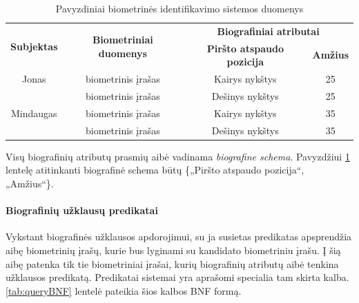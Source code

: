 \begin{table}[H]\footnotesize
	\centering
	\begin{tabular}{|c|c|c|c|}
		\hline
		\multirow{2}{*}{{\bf Subjektas}} & \multirow{2}{*}{{\bf Biometriniai duomenys}} & \multicolumn{2}{|c|}{{\bf Biografiniai atributai}}  \\ \cline{3-4}
		& & {\bf Piršto atspaudo pozicija} & {\bf Amžius} \\
		\hline
		Jonas  & biometrinis įrašas & Kairys nykštys  & 25 \\ \cline{2-4}
		       & biometrinis įrašas & Dešinys nykštys & 25 \\
		\hline
		Mindaugas & biometrinis įrašas & Kairys nykštys  & 35 \\ \cline{2-4}
		          & biometrinis įrašas & Dešinys nykštys & 35 \\
		\hline
	\end{tabular}
	\caption{Pavyzdiniai biometrinės identifikavimo sistemos duomenys}
	\label{tab:exampleGallery}
\end{table}

Visų biografinių atributų prasmių aibė vadinama {\it biografine schema}. Pavyzdžiui \ref{tab:exampleGallery} lentelę atitinkanti biografinė schema būtų \{„Piršto atspaudo pozicija“, „Amžius“\}.

\paragraph{Biografinių užklausų predikatai}

Vykstant biografinės užklausos apdorojimui, su ja susietas predikatas apsprendžia aibę biometrinių įrašų, kurie bus lyginami su kandidato biometriniu įrašu.
Į šią aibę patenka tik tie biometriniai įrašai, kurių biografinių atributų aibė tenkina užklausos predikatą.
Predikatai sistemai yra aprašomi specialia tam skirta kalba.
\ref{tab:queryBNF} lentelė pateikia šios kalbos BNF formą.


